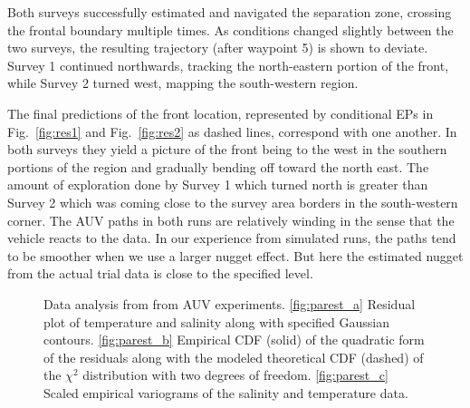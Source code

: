 \documentclass[aoas,preprint]{imsart}
\begin{document}
Both surveys successfully estimated and navigated the separation zone,
crossing the frontal boundary multiple times. As conditions changed
slightly between the two surveys, the resulting trajectory (after
waypoint 5) is shown to deviate. Survey 1 continued northwards,
tracking the north-eastern portion of the front, while Survey 2 turned
west, mapping the south-western region.

The final predictions of the front location, represented by
conditional EPs in Fig.~\ref{fig:res1} and Fig.~\ref{fig:res2} as
dashed lines, correspond with one another. In both surveys they yield
a picture of the front being to the west in the southern portions of
the region and gradually bending off toward the north east. The amount
of exploration done by Survey 1 which turned north is greater than
Survey 2 which was coming close to the survey area borders in the
south-western corner.  The AUV paths in both runs are relatively
winding in the sense that the vehicle reacts to the data. In our
experience from simulated runs, the paths tend to be smoother when we
use a larger nugget effect. But here the estimated nugget from the
actual trial data is close to the specified level.

\begin{figure}[!b]
  \centering
  \hfill
  \hfill
  \caption{Data analysis from from AUV experiments. \ref{fig:parest_a} Residual plot of temperature and salinity
    along with specified Gaussian contours. \ref{fig:parest_b} Empirical CDF
    (solid) of the quadratic form of the residuals along with the
    modeled theoretical CDF (dashed) of the $\chi^2$ distribution with two
    degrees of freedom. \ref{fig:parest_c} Scaled empirical variograms of the
    salinity and temperature data.}
\label{fig:parest}
\end{figure}
\end{document}

